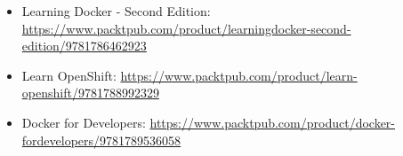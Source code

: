 

\begin{itemize}
\item 
Learning Docker - Second Edition: \url{https://www.packtpub.com/product/learningdocker-second-edition/9781786462923}

\item 
Learn OpenShift: \url{https://www.packtpub.com/product/learn-openshift/9781788992329}

\item 
Docker for Developers: \url{https://www.packtpub.com/product/docker-fordevelopers/9781789536058}
\end{itemize}
